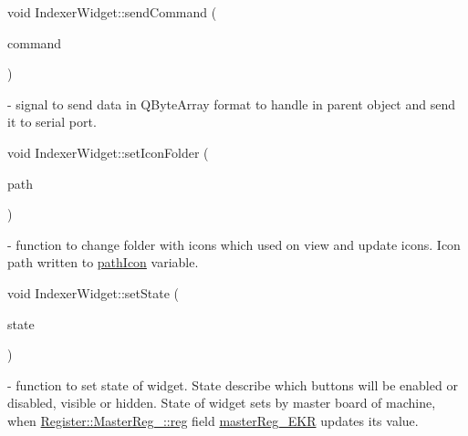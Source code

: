 \mbox{\label{classIndexerWidget_ae1a3d974cf2f93385e76e635df2a4c07}} 
{\footnotesize\ttfamily void Indexer\+Widget\+::\texorpdfstring{send\+Command}{sendCommand} (\begin{DoxyParamCaption}\item[{Q\+Byte\+Array}]{command }\end{DoxyParamCaption}){\ttfamily [signal]}}- signal to send data in Q\+Byte\+Array format to handle in parent object and send it to serial port.

\mbox{\label{classIndexerWidget_af3faa0bf1c820ff960f0f4be49ed453b}} 
{\footnotesize\ttfamily void Indexer\+Widget\+::\texorpdfstring{set\+Icon\+Folder}{setIconFolder} (\begin{DoxyParamCaption}\item[{Q\+String}]{path }\end{DoxyParamCaption})}- function to change folder with icons which used on view and update icons. Icon path written to \hyperlink{classIndexerWidget_ad3787e740fc417fdcb74202c9953788f}{path\+Icon} variable.

\mbox{\label{classIndexerWidget_a80cbb27852773541d0fe05d44b571f20}} 
{\footnotesize\ttfamily void Indexer\+Widget\+::\texorpdfstring{set\+State}{setState} (\begin{DoxyParamCaption}\item[{u\+\_\+int16\+\_\+t}]{state }\end{DoxyParamCaption}){\ttfamily [slot]}} - function to set state of widget. State describe which buttons will be enabled or disabled, visible or hidden. State of widget sets by master board of machine, when \hyperlink{structRegister_1_1MasterReg___1_1reg}{Register\+::\+Master\+Reg\+\_\+\+::reg} field \hyperlink{structRegister_1_1MasterReg___1_1reg_aa5111a7f8eddbd8f8d6c92e23f326946}{master\+Reg\+\_\+\+E\+KR} updates its value.


